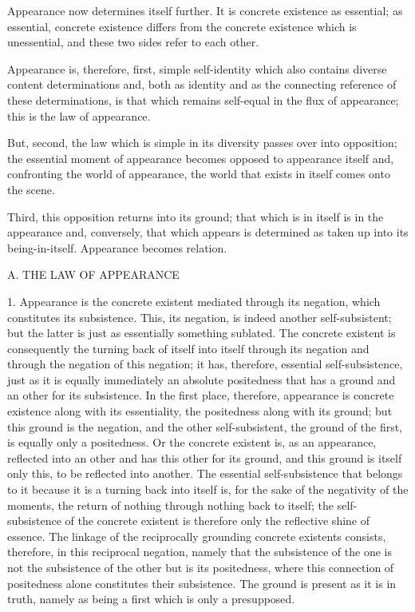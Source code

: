 Appearance now determines itself further.
It is concrete existence as essential;
as essential, concrete existence
differs from the concrete existence
which is unessential,
and these two sides
refer to each other.

Appearance is, therefore,
first, simple self-identity
which also contains
diverse content determinations
and, both as identity
and as the connecting reference
of these determinations,
is that which remains self-equal
in the flux of appearance;
this is the law of appearance.

But, second, the law which is
simple in its diversity
passes over into opposition;
the essential moment of appearance becomes
opposed to appearance itself
and, confronting the world of appearance,
the world that exists in itself
comes onto the scene.

Third, this opposition returns into its ground;
that which is in itself is in the appearance
and, conversely, that which appears is determined
as taken up into its being-in-itself.
Appearance becomes relation.

A. THE LAW OF APPEARANCE

1. Appearance is the concrete existent
mediated through its negation,
which constitutes its subsistence.
This, its negation, is
indeed another self-subsistent;
but the latter is just as
essentially something sublated.
The concrete existent is consequently
the turning back of itself into itself
through its negation and through
the negation of this negation;
it has, therefore, essential self-subsistence,
just as it is equally immediately an absolute positedness
that has a ground and an other for its subsistence.
In the first place, therefore, appearance is
concrete existence along with its essentiality,
the positedness along with its ground;
but this ground is the negation,
and the other self-subsistent,
the ground of the first,
is equally only a positedness.
Or the concrete existent is,
as an appearance,
reflected into an other
and has this other for its ground,
and this ground is itself only this,
to be reflected into another.
The essential self-subsistence
that belongs to it because
it is a turning back into itself is,
for the sake of the negativity of the moments,
the return of nothing through nothing back to itself;
the self-subsistence of the concrete existent is
therefore only the reflective shine of essence.
The linkage of the reciprocally grounding
concrete existents consists, therefore,
in this reciprocal negation,
namely that the subsistence of the one is not
the subsistence of the other but is its positedness,
where this connection of positedness
alone constitutes their subsistence.
The ground is present as it is in truth,
namely as being a first which is only a presupposed.

